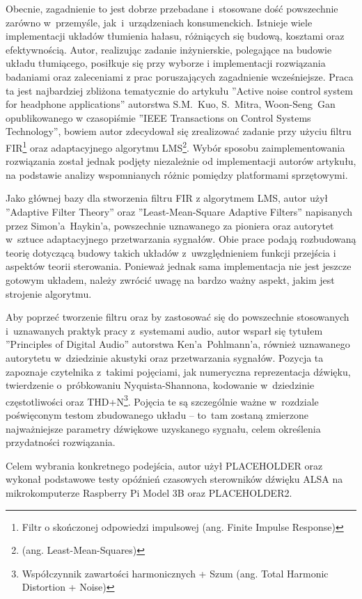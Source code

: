 Obecnie, zagadnienie to jest dobrze przebadane i~stosowane dość powszechnie zarówno w~przemyśle, jak~i~urządzeniach konsumenckich. Istnieje wiele implementacji układów tłumienia hałasu, różniących się budową, kosztami oraz efektywnością. Autor, realizując zadanie inżynierskie, polegające na budowie układu tłumiącego, posiłkuje się przy wyborze i implementacji rozwiązania badaniami oraz zaleceniami z prac poruszających zagadnienie wcześniejsze. Praca ta jest najbardziej zbliżona tematycznie do artykułu ''Active noise control system for headphone applications'' autorstwa S.M.~Kuo, S.~Mitra, Woon-Seng~Gan opublikowanego w czasopiśmie ''IEEE Transactions on Control Systems Technology'', bowiem autor zdecydował się zrealizować zadanie przy użyciu filtru FIR\footnote{Filtr o skończonej odpowiedzi impulsowej (ang. Finite Impulse Response)} oraz  adaptacyjnego algorytmu LMS\footnote{%
(ang. Least-Mean-Squares)}. Wybór sposobu zaimplementowania rozwiązania został jednak podjęty niezależnie od implementacji autorów artykułu, na podstawie analizy wspomnianych różnic pomiędzy platformami sprzętowymi.

Jako głównej bazy dla stworzenia filtru FIR z algorytmem LMS, autor użył ''Adaptive Filter Theory'' oraz ''Least-Mean-Square Adaptive Filters'' napisanych przez Simon'a~Haykin'a, powszechnie uznawanego za pioniera oraz autorytet w~sztuce adaptacyjnego przetwarzania sygnałów. Obie prace podają rozbudowaną teorię dotyczącą budowy takich układów z~uwzględnieniem funkcji przejścia i aspektów teorii sterowania. Ponieważ jednak sama implementacja nie jest jeszcze gotowym układem, należy zwrócić uwagę na bardzo ważny aspekt, jakim jest strojenie algorytmu.

Aby poprzeć tworzenie filtru oraz by zastosować się do powszechnie stosowanych i~uznawanych praktyk pracy z~systemami audio, autor wsparł się tytułem ''Principles of Digital Audio'' autorstwa Ken'a~Pohlmann'a, również uznawanego autorytetu w~dziedzinie akustyki oraz przetwarzania sygnałów. Pozycja ta zapoznaje czytelnika z~takimi pojęciami, jak numeryczna reprezentacja d\'zwięku, twierdzenie o~próbkowaniu Nyquista-Shannona, kodowanie w~dziedzinie częstotliwości oraz THD+N\footnote{Współczynnik zawartości harmonicznych + Szum	(ang. Total Harmonic Distortion + Noise)}. Pojęcia te są szczególnie ważne w~rozdziale poświęconym testom zbudowanego układu -- to~tam zostaną zmierzone najważniejsze parametry d\'zwiękowe uzyskanego sygnału, celem określenia przydatności rozwiązania.

Celem wybrania konkretnego podejścia, autor użył PLACEHOLDER %
oraz wykonał podstawowe testy opóźnień czasowych sterowników dźwięku ALSA na mikrokomputerze Raspberry Pi Model 3B oraz PLACEHOLDER2.%

